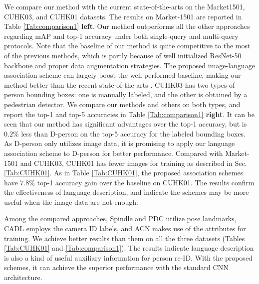 \documentclass[runningheads]{llncs}
\begin{document}
 We compare our method with the current state-of-the-arts on the Market1501, CUHK03, and CUHK01 datasets. The results on Market-1501 are reported in Table \ref{Tab:comparison1} \textbf{left}. Our method outperforms all the other approaches regarding mAP and top-1 accuracy under both single-query and multi-query protocols.  Note that the baseline of our method is quite competitive to the most of the previous methods, which is partly because of well initialized ResNet-50 backbone and  proper data augmentation strategies. The proposed image-language association scheme can largely boost the well-performed baseline, making our method better than the recent state-of-the-arts \cite{almazan2018re,deep-person}. CUHK03 has two types of person bounding boxes: one is manually labeled,  and the other is obtained by a pedestrian detector. We compare our methods and others on both types, and report the top-1 and top-5 accuracies in Table \ref{Tab:comparison1} \textbf{right}. It can be seen that our method has significant advantages over the  top-1 accuracy, but is 0.2\% less than D-person \cite{deep-person} on the top-5 accuracy for the labeled bounding boxes. As D-person only utilizes image data, it is promising to apply our language association scheme to D-person for better performance.  Compared with Market-1501 and CUHK03, CUHK01 has fewer images for training as described in Sec. \ref{Tab:CUHK01}.  As in Table \ref{Tab:CUHK01},
the proposed association schemes have 7.8\% top-1 accuracy gain over the baseline on CUHK01. The results confirm the effectiveness of language description, and indicate the schemes may be more useful when the image data are not enough. 
 
 Among the compared approaches, Spindle\cite{zhao2017spindle} and  PDC\cite{Su_2017_ICCV} utilize pose landmarks,  CADL\cite{Lin2017CVPRcamera} employs the camera ID labels, and ACN\cite{ACN} makes use of the attributes for training.
We achieve better results than them on all the three datasets (Tables \ref{Tab:CUHK01} and \ref{Tab:comparison1}).  The results indicate language description is also a kind of  useful auxiliary information for person re-ID. With the proposed schemes, it can achieve the superior performance with the standard CNN architecture.
 
 
\end{document}
